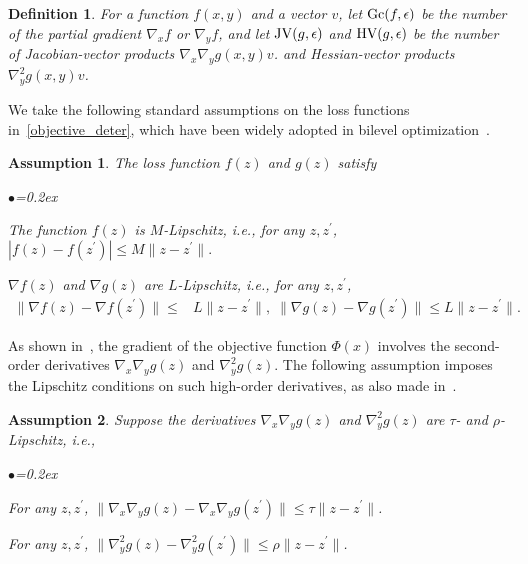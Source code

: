 \documentclass{osudissert96}
\newtheorem{assum}{Assumption}
\newtheorem{definition}{Definition}
\begin{document}
\begin{definition}\label{com_measure}
For a function $f(x,y)$ and a vector $v$, let $\mbox{\normalfont Gc}(f,\epsilon)$ be the number of the partial gradient $\nabla_x f$ or $\nabla_y f$, and let $\mbox{\normalfont JV}(g,\epsilon)$ and  $\mbox{\normalfont HV}(g,\epsilon)$ be the number of Jacobian-vector products $\nabla_x\nabla_y g (x,y)v$. 
  and  Hessian-vector products $\nabla_y^2g(x,y) v$. 
 \end{definition} 
We  take the following standard assumptions on the loss functions in~\cref{objective_deter}, which have been widely adopted in bilevel optimization~\cite{ghadimi2018approximation,ji2020convergence}.
\begin{assum}\label{ass:lip}
The loss function $f(z)$ and $g(z)$ satisfy
\begin{list}{$\bullet$}{\topsep=0.2ex \leftmargin=0.2in  \itemsep =0.01in}
\item The function $f(z)$ is $M$-Lipschitz, i.e.,  for any $z,z^\prime$, $|f(z)-f(z^\prime)|\leq M\|z-z^\prime\|.$
\item $\nabla f(z)$ and $\nabla g(z)$ are $L$-Lipschitz, i.e., for any $z,z^\prime$, 
\vspace{-0.1cm}
\begin{align*}
\|\nabla f(z)-\nabla f(z^\prime)\|\leq& L\|z-z^\prime\|,\;\|\nabla g(z)-\nabla g(z^\prime)\|\leq L\|z-z^\prime\|.
\end{align*}
\end{list}
\vspace{-0.2cm}
\end{assum}
As shown in~, the gradient of the objective function $\Phi(x)$ involves the second-order derivatives $\nabla_x\nabla_y g(z)$ and $\nabla_y^2 g(z)$. The following assumption imposes the Lipschitz conditions on such high-order derivatives, as also made in~\cite{ghadimi2018approximation}.
\begin{assum}\label{high_lip}
Suppose the derivatives $\nabla_x\nabla_y g(z)$ and $\nabla_y^2 g(z)$ are $\tau$- and $\rho$- Lipschitz, i.e.,
\begin{list}{$\bullet$}{\topsep=0.2ex \leftmargin=0.2in  \itemsep =0.02in}
\item For any $z,z^\prime$, $\|\nabla_x\nabla_y g(z)-\nabla_x\nabla_y g(z^\prime)\| \leq \tau \|z-z^\prime\|$.
\item For any $z,z^\prime$, $\|\nabla_y^2 g(z)-\nabla_y^2 g(z^\prime)\|\leq \rho \|z-z^\prime\|$.
\end{list} 
\end{assum}
\end{document}
